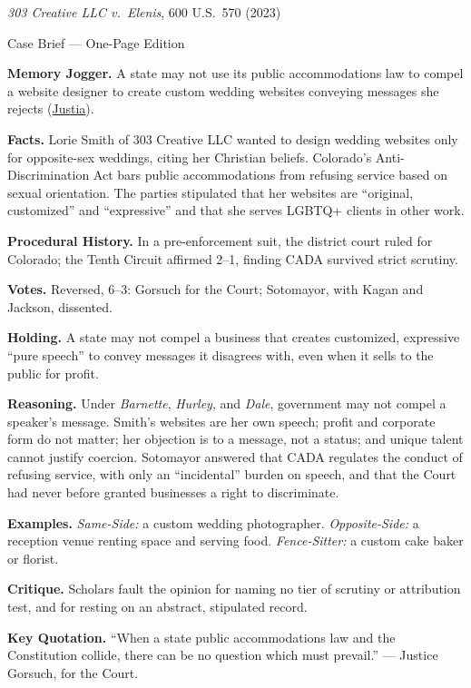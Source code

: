 \documentclass[12pt]{article}
\begin{document}
\begin{center}
{\Large \textit{303 Creative LLC v.\ Elenis}, 600 U.S.\ 570 (2023)\par}
\vspace{0.3em}
{\normalsize Case Brief --- One-Page Edition\par}
\end{center}

\textbf{Memory Jogger.} A state may not use its public accommodations law to compel a website designer to create custom wedding websites conveying messages she rejects (\href{https://supreme.justia.com/cases/federal/us/600/21-476/}{Justia}).

\textbf{Facts.} Lorie Smith of 303 Creative LLC wanted to design wedding websites only for opposite-sex weddings, citing her Christian beliefs. Colorado's Anti-Discrimination Act bars public accommodations from refusing service based on sexual orientation. The parties stipulated that her websites are ``original, customized'' and ``expressive'' and that she serves LGBTQ+ clients in other work.

\textbf{Procedural History.} In a pre-enforcement suit, the district court ruled for Colorado; the Tenth Circuit affirmed 2--1, finding CADA survived strict scrutiny.

\textbf{Votes.} Reversed, 6--3: Gorsuch for the Court; Sotomayor, with Kagan and Jackson, dissented.

\textbf{Holding.} A state may not compel a business that creates customized, expressive ``pure speech'' to convey messages it disagrees with, even when it sells to the public for profit.

\textbf{Reasoning.} Under \textit{Barnette}, \textit{Hurley}, and \textit{Dale}, government may not compel a speaker's message. Smith's websites are her own speech; profit and corporate form do not matter; her objection is to a message, not a status; and unique talent cannot justify coercion. Sotomayor answered that CADA regulates the conduct of refusing service, with only an ``incidental'' burden on speech, and that the Court had never before granted businesses a right to discriminate.

\textbf{Examples.} \emph{Same-Side:} a custom wedding photographer. \emph{Opposite-Side:} a reception venue renting space and serving food. \emph{Fence-Sitter:} a custom cake baker or florist.

\textbf{Critique.} Scholars fault the opinion for naming no tier of scrutiny or attribution test, and for resting on an abstract, stipulated record.

\textbf{Key Quotation.} ``When a state public accommodations law and the Constitution collide, there can be no question which must prevail.'' --- Justice Gorsuch, for the Court.
\end{document}
